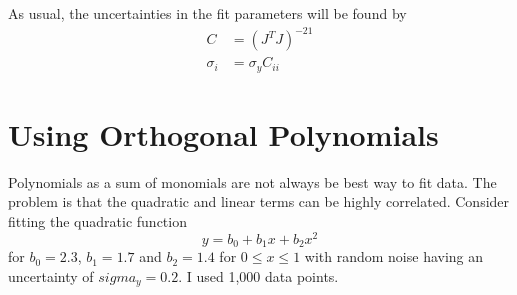 \documentclass{scrartcl}
\begin{document}
As usual, the uncertainties in the fit parameters will be found by
\begin{align}
C &= (J^TJ)^{-21}\\
\sigma_i &= \sigma_y C_{ii}
\end{align}
\section{Using Orthogonal Polynomials}
Polynomials as a sum of monomials are not always be best way to
fit data. The problem is that the quadratic and linear terms can
be highly correlated. Consider fitting the quadratic function
\begin{equation}
y=b_0 + b_1 x + b_2 x^2
\end{equation}
for $b_0 = 2.3$, $b_1 = 1.7$ and $b_2=1.4$ for $0\leq x\leq 1$ with
random noise having an uncertainty of $sigma_y = 0.2$. I used 1,000
data points.
\end{document}
